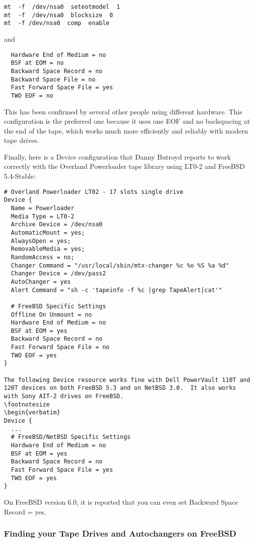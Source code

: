 {\footnotesize
\begin{verbatim}
mt  -f  /dev/nsa0  seteotmodel  1
mt  -f  /dev/nsa0  blocksize  0
mt  -f /dev/nsa0  comp  enable
\end{verbatim}
\normalsize

and

\footnotesize
\begin{verbatim}
  Hardware End of Medium = no
  BSF at EOM = no
  Backward Space Record = no
  Backward Space File = no
  Fast Forward Space File = yes
  TWO EOF = no
\end{verbatim}
\normalsize

This has been confirmed by several other people using different hardware. This
configuration is the preferred one because it uses one EOF and no backspacing
at the end of the tape, which works much more efficiently and reliably with
modern tape drives.

Finally, here is a Device configuration that Danny Butroyd reports to work
correctly with the Overland Powerloader tape library using LT0-2 and
FreeBSD 5.4-Stable:

\footnotesize
\begin{verbatim}
# Overland Powerloader LT02 - 17 slots single drive
Device {
  Name = Powerloader
  Media Type = LT0-2
  Archive Device = /dev/nsa0
  AutomaticMount = yes;
  AlwaysOpen = yes;
  RemovableMedia = yes;
  RandomAccess = no;
  Changer Command = "/usr/local/sbin/mtx-changer %c %o %S %a %d"
  Changer Device = /dev/pass2
  AutoChanger = yes
  Alert Command = "sh -c 'tapeinfo -f %c |grep TapeAlert|cat'"

  # FreeBSD Specific Settings
  Offline On Unmount = no
  Hardware End of Medium = no
  BSF at EOM = yes
  Backward Space Record = no
  Fast Forward Space File = no
  TWO EOF = yes
}

The following Device resource works fine with Dell PowerVault 110T and
120T devices on both FreeBSD 5.3 and on NetBSD 3.0.  It also works
with Sony AIT-2 drives on FreeBSD.
\footnotesize
\begin{verbatim}
Device {
  ...
  # FreeBSD/NetBSD Specific Settings
  Hardware End of Medium = no
  BSF at EOM = yes
  Backward Space Record = no
  Fast Forward Space File = yes
  TWO EOF = yes
}
\end{verbatim}
\normalsize

On FreeBSD version 6.0, it is reported that you can even set
Backward Space Record = yes.



\subsubsection{Finding your Tape Drives and Autochangers on FreeBSD}

}
